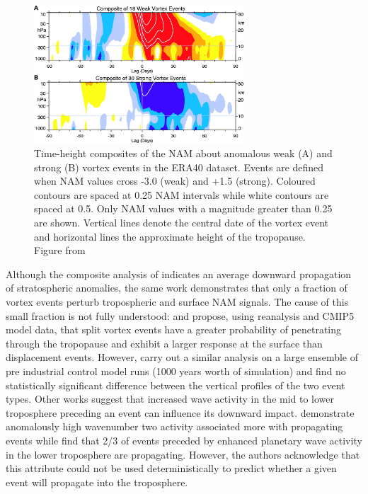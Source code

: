 \begin{figure}[h!]
\centering
    \includegraphics[width=0.7\textwidth]{Figures/Figures-background/baldwin_composite.jpg}
    \caption[Time-height composites of the NAM about anomalous vortex events in the ERA40 dataset from \cite{baldwinStratospheric2001a}.]{Time-height composites of the NAM about anomalous weak (A) and strong (B) vortex events in the ERA40 dataset. Events are defined when NAM values cross -3.0 (weak) and +1.5 (strong). Coloured contours are spaced at 0.25 NAM intervals while white contours are spaced at 0.5. Only NAM values with a magnitude greater than 0.25 are shown. Vertical lines denote the central date of the vortex event and horizontal lines the approximate height of the tropopause. Figure from \cite{baldwinStratospheric2001a}}  
    \label{fig:Baldwin_composite}
\centering
\end{figure}

Although the composite analysis of \cite{baldwinStratospheric2001a} indicates an average downward propagation of stratospheric anomalies, the same work demonstrates that only a fraction of vortex events perturb tropospheric and surface NAM signals. The cause of this small fraction is not fully understood: \cite{Mitchell2011} and \cite{Seviour2016} propose, using reanalysis and CMIP5 model data, that split vortex events have a greater probability of penetrating through the tropopause and exhibit a larger response at the surface than displacement events. However, \cite{Maycock2015} carry out a similar analysis on a large ensemble of pre industrial control model runs (1000 years worth of simulation) and find no statistically significant difference between the vertical profiles of the two event types. Other works suggest that increased wave activity in the mid to lower troposphere preceding an event can influence its downward impact. \cite{Nakagawa2006} demonstrate anomalously high wavenumber two activity associated more with propagating events while \cite{White2019} find that 2/3 of events preceded by enhanced planetary wave activity in the lower troposphere are propagating. However, the authors acknowledge that this attribute could not be used deterministically to predict whether a given event will propagate into the troposphere.

